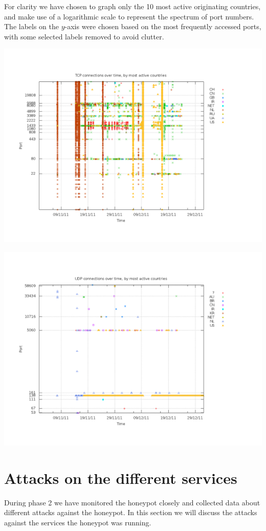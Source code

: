\documentclass[11pt]{article}
\begin{document}
For clarity we have chosen to graph only the 10 most active originating countries, and make use of a logarithmic scale to represent the spectrum of port numbers.
The labels on the \(y\)-axis were chosen based on the most frequently accessed ports, with some selected labels removed to avoid clutter.

\includegraphics[width=1.7\textwidth,angle=-90]{tcp.png}

\includegraphics[width=1.7\textwidth,angle=-90]{udp.png}

\section{Attacks on the different services}
\label{Attacks}
During phase 2 we have monitored the honeypot closely and collected data about different attacks against the honeypot. In this section we will discuss the attacks against the services the honeypot was running.
\end{document}
